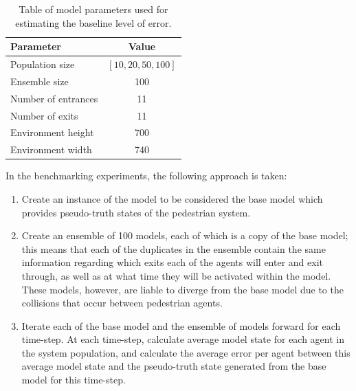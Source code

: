 \documentclass{article}
\begin{document}
\begin{table}[ht]
    \centering
    \begin{tabular}{@{}lc@{}}
        \toprule
        Parameter           & Value \\ \midrule
        Population size     & $[10, 20, 50, 100 ]$   \\
        Ensemble size       & 100   \\
        Number of entrances & 11    \\
        Number of exits     & 11    \\
        Environment height  & 700   \\
        Environment width   & 740   \\ \bottomrule
    \end{tabular}\caption{Table of model parameters used for estimating the
    baseline level of error.}\label{tab:gcs_baseline_params}
\end{table}

In the benchmarking experiments, the following approach is taken:
\begin{enumerate}
	\item Create an instance of the model to be considered the base model which
	provides pseudo-truth states of the pedestrian system.
	\item Create an ensemble of 100 models, each of which is a copy of the base
	model; this means that each of the duplicates in the ensemble contain
	the same information regarding which exits each of the agents will enter
	and exit through, as well as at what time they will be activated within
	the model. These models, however, are liable to diverge from the base
	model due to the collisions that occur between pedestrian agents.
	\item Iterate each of the base model and the ensemble of models forward for
	each time-step. At each time-step, calculate average model state for
	each agent in the system population, and calculate the average error per
	agent between this average model state and the pseudo-truth state
	generated from the base model for this time-step.
\end{enumerate}
\end{document}
